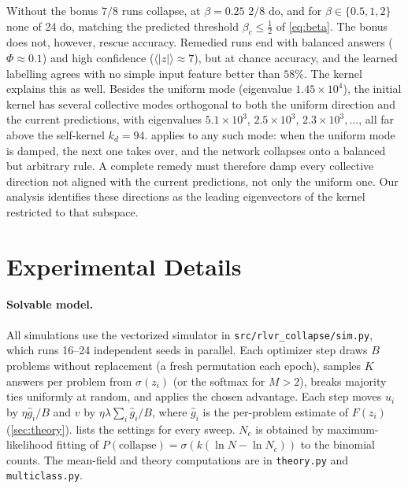 Without the bonus $7/8$ runs collapse, at $\beta=0.25$ $2/8$ do, and for $\beta\in\{0.5,1,2\}$ none of 24 do, matching the predicted threshold $\beta_c\le\tfrac12$ of \cref{eq:beta}.
The bonus does not, however, rescue accuracy. Remedied runs end with balanced answers ($\Phi\approx0.1$) and high confidence ($\langle|z|\rangle\approx7$), but at chance accuracy, and the learned labelling agrees with no simple input feature better than $58\%$.
The kernel explains this as well. Besides the uniform mode (eigenvalue $1.45\times10^4$), the initial kernel has several collective modes orthogonal to both the uniform direction and the current predictions, with eigenvalues $5.1\times10^3$, $2.5\times10^3$, $2.3\times10^3,\dots$, all far above the self-kernel $k_d=94$.
 applies to any such mode: when the uniform mode is damped, the next one takes over, and the network collapses onto a balanced but arbitrary rule.
A complete remedy must therefore damp every collective direction not aligned with the current predictions, not only the uniform one. Our analysis identifies these directions as the leading eigenvectors of the kernel restricted to that subspace.




\section{Experimental Details}
\label{app:details}

\paragraph{Solvable model.}
All simulations use the vectorized simulator in \texttt{src/rlvr\_collapse/sim.py}, which runs 16--24 independent seeds in parallel.
Each optimizer step draws $B$ problems without replacement (a fresh permutation each epoch), samples $K$ answers per problem from $\sigma(z_i)$ (or the softmax for $M>2$), breaks majority ties uniformly at random, and applies the chosen advantage.
Each step moves $u_i$ by $\eta\hat g_i/B$ and $v$ by $\eta\lambda\sum_i\hat g_i/B$, where $\hat g_i$ is the per-problem estimate of $F(z_i)$ (\cref{sec:theory}).
 lists the settings for every sweep.
$N_c$ is obtained by maximum-likelihood fitting of $P(\text{collapse})=\sigma(k(\ln N-\ln N_c))$ to the binomial counts.
The mean-field and theory computations are in \texttt{theory.py} and \texttt{multiclass.py}.

